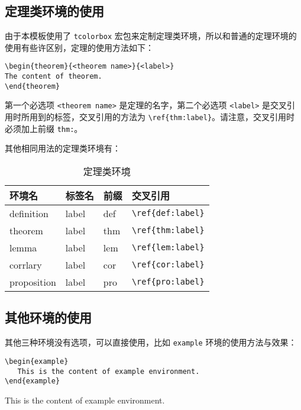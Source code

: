 \documentclass[cn,11pt,fancy,hide,pad]{elegantbook}
\begin{document}
\subsection{定理类环境的使用}
由于本模板使用了 \lstinline{tcolorbox} 宏包来定制定理类环境，所以和普通的定理环境的使用有些许区别，定理的使用方法如下：
\begin{lstlisting}
\begin{theorem}{<theorem name>}{<label>}
The content of theorem.
\end{theorem}
\end{lstlisting}

第一个必选项 \lstinline{<theorem name>} 是定理的名字，第二个必选项 \lstinline{<label>} 是交叉引用时所用到的标签，交叉引用的方法为 \verb|\ref{thm:label}|。请注意，交叉引用时必须加上前缀 \lstinline{thm:}。

其他相同用法的定理类环境有：

\begin{table}[htbp]
   \centering
   \caption{定理类环境}
     \begin{tabular}{llll}
     \toprule
     环境名 & 标签名 & 前缀 & 交叉引用 \\
     \midrule
     definition & label & def   & \lstinline|\ref{def:label}| \\
     theorem & label & thm   & \lstinline|\ref{thm:label}| \\
     lemma & label & lem   & \lstinline|\ref{lem:label}| \\
     corrlary & label & cor   & \lstinline|\ref{cor:label}| \\
     proposition & label & pro   & \lstinline|\ref{pro:label}| \\
     \bottomrule
     \end{tabular}%
   \label{tab:theorem-class}%
 \end{table}%
 

\subsection{其他环境的使用}
其他三种环境没有选项，可以直接使用，比如 \lstinline{example} 环境的使用方法与效果：
\begin{lstlisting}
\begin{example}
   This is the content of example environment.
\end{example}
\end{lstlisting}

\begin{example}
This is the content of example environment.
\end{example}
\end{document}
